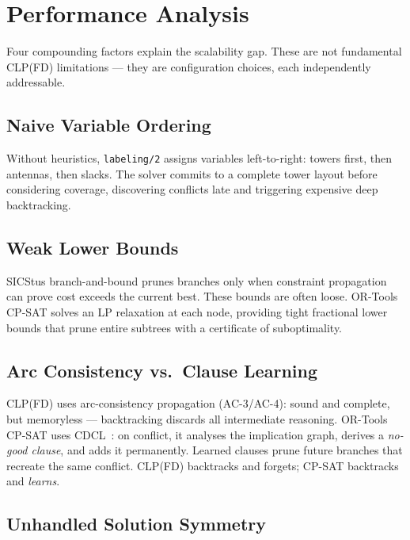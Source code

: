 \documentclass{llncs}
\begin{document}
\section{Performance Analysis}
\label{sec:analysis}

Four compounding factors explain the scalability gap. These are not fundamental
CLP(FD) limitations --- they are configuration choices, each independently
addressable.

\subsection{Naive Variable Ordering}

Without heuristics, \texttt{labeling/2} assigns variables left-to-right:
towers first, then antennas, then slacks. The solver commits to a complete
tower layout before considering coverage, discovering conflicts late and
triggering expensive deep backtracking.

\subsection{Weak Lower Bounds}

SICStus branch-and-bound prunes branches only when constraint propagation can
prove cost exceeds the current best. These bounds are often loose. OR-Tools
CP-SAT solves an LP relaxation at each node, providing tight fractional lower
bounds that prune entire subtrees with a certificate of suboptimality.

\subsection{Arc Consistency vs.\ Clause Learning}

CLP(FD) uses arc-consistency propagation (AC-3/AC-4): sound and complete, but
memoryless --- backtracking discards all intermediate reasoning. OR-Tools
CP-SAT uses CDCL~\cite{sat}: on conflict, it analyses the implication graph,
derives a \emph{no-good clause}, and adds it permanently. Learned clauses
prune future branches that recreate the same conflict. CLP(FD) backtracks and
forgets; CP-SAT backtracks and \emph{learns}.

\subsection{Unhandled Solution Symmetry}
\label{sec:sym}
\end{document}
